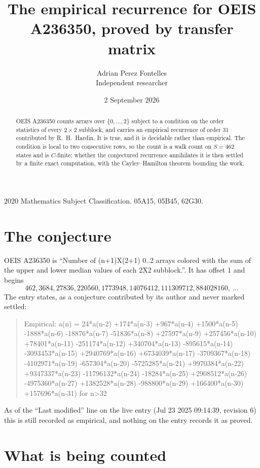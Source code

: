 \documentclass[11pt,a4paper]{article}
\title{The empirical recurrence for OEIS A236350, proved by transfer matrix}
\author{Adrian Perez Fontelles\\ \small Independent researcher}
\date{2 September 2026}
\theoremstyle{plain}
\theoremstyle{definition}
\begin{document}
\maketitle

\begin{abstract}
OEIS A236350 counts arrays over $\{0,\dots,2\}$ subject to a condition on the order
statistics of every $2\times2$ subblock, and carries an empirical recurrence of order
$31$ contributed by R.~H.~Hardin. It is true, and it is decidable rather than empirical.
The condition is local to two consecutive rows, so the count is a walk count on $S=462$
states and is $C$-finite; whether the conjectured recurrence annihilates it is then settled by
a finite exact computation, with the Cayley--Hamilton theorem bounding the work.
\end{abstract}

\noindent\small 2020 Mathematics Subject Classification. 05A15, 05B45, 62G30.\normalsize

\section{The conjecture}

OEIS A236350 is ``Number of (n+1)X(2+1) 0..2 arrays colored with the sum of the upper and lower median values of each 2X2 subblock.''. It has offset $1$ and begins
\[
462, 3684, 27836, 220560, 1773948, 14076412, 111309712, 884028160,\ \dots
\]
The entry states, as a conjecture contributed by its author and never marked settled:
\begin{quote}
Empirical: a(n) = 24*a(n-2) +174*a(n-3) +967*a(n-4) +1500*a(n-5) -1888*a(n-6) -18876*a(n-7) -51836*a(n-8) +27597*a(n-9) +257456*a(n-10) +78401*a(n-11) -251174*a(n-12) +340704*a(n-13) -895615*a(n-14) -3093453*a(n-15) +2940769*a(n-16) +6734039*a(n-17) -3709367*a(n-18) -4102971*a(n-19) -657304*a(n-20) -5725285*a(n-21) +9970384*a(n-22) +9347337*a(n-23) -11796132*a(n-24) -18284*a(n-25) +2908512*a(n-26) -4975360*a(n-27) +1382528*a(n-28) -988800*a(n-29) +166400*a(n-30) +157696*a(n-31) for n>32
\end{quote}
As of the ``Last modified'' line on the live entry (Jul 23 2025 09:14:39, revision 6) this is still
recorded as empirical, and nothing on the entry records it as proved.

\section{What is being counted}
\end{document}
